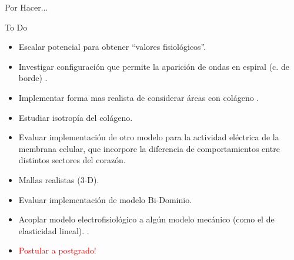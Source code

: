 \documentclass[11pt,spanish]{beamer}
\newcommand{\red}{\textcolor{red}}
\begin{document}
\begin{frame}
\begin{center}
\Huge Por Hacer...
\end{center}
\end{frame}

\begin{frame}{To Do}

\begin{itemize}
\item Escalar potencial para obtener ``valores fisiológicos''. \pause
\item Investigar configuración que permite la aparición de ondas en espiral (c. de borde) \cite{TenTusscher2007Europace}. \pause
\item Implementar forma mas realista de considerar áreas con colágeno \cite{Comtois2011IEEE}. \pause
\item Estudiar isotropía del colágeno.
\item Evaluar implementación de otro modelo para la actividad eléctrica de la membrana celular, que incorpore la diferencia de comportamientos entre distintos sectores del corazón. \pause
\item Mallas realistas (3-D). \pause
\item Evaluar implementación de modelo Bi-Dominio. \pause
\item Acoplar modelo electrofisiológico a algún modelo mecánico (como el de elasticidad lineal). \cite{Kirk2014pp}. \pause
\item \red{Postular a postgrado!}
\end{itemize}
\end{frame}


\begin{frame}
\begin{center}
{}


\end{center}
\end{frame}
\end{document}
